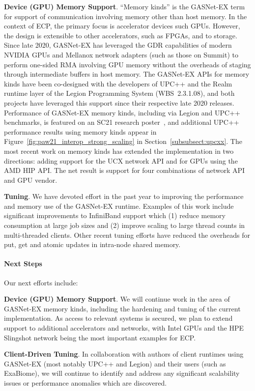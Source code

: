 \textbf{Device (GPU) Memory Support}.
``Memory kinds'' is the GASNet-EX term for support of communication involving
memory other than host memory.  In the context of ECP, the primary focus is
accelerator devices such GPUs.  However, the design is extensible to other
accelerators, such as FPGAs, and to storage.
Since late 2020, GASNet-EX has leveraged the GDR
capabilities of modern NVIDIA GPUs and Mellanox network adapters (such as those
on Summit) to perform one-sided RMA involving GPU memory without
the overheads of staging through intermediate buffers in host memory.
The GASNet-EX APIs for memory kinds have been co-designed with the developers
of UPC++ and the Realm runtime layer of the Legion Programming System
(WBS~2.3.1.08), and both projects have leveraged this support since
their respective late 2020 releases.
Performance of GASNet-EX memory kinds, including via Legion and UPC++
benchmarks, is featured on an SC21 research poster~\cite{gasnet-poster-sc21},
and additional UPC++ performance results using memory kinds appear in
Figure~\ref{fig:paw21_interop_strong_scaling} in
Section~\ref{subsubsect:upcxx}.
The most recent work on memory kinds has extended the implementation in two directions:
adding support for the UCX network API and for GPUs using the AMD HIP API.
The net result is support for four combinations of network API and GPU vendor.

\textbf{Tuning}.
We have devoted effort in the past year to improving the performance and memory
use of the GASNet-EX runtime.  Examples of this work include significant
improvements to InfiniBand support which (1) reduce memory consumption at large
job sizes and (2) improve scaling to large thread counts in multi-threaded
clients.  Other recent tuning efforts have reduced the overheads for put, get
and atomic updates in intra-node shared memory.

\paragraph{Next Steps}

Our next efforts include:

\textbf{Device (GPU) Memory Support}.
We will continue work in the area of GASNet-EX memory kinds, including the
hardening and tuning of the current implementation.
As access to relevant systems is secured, we plan to extend support to
additional accelerators and networks, with Intel GPUs and the HPE Slingshot
network being the most important examples for ECP.

\textbf{Client-Driven Tuning}.
In collaboration with authors of client runtimes using GASNet-EX (most notably
UPC++ and Legion) and their users (such as ExaBiome), we will continue to
identify and address any significant scalability issues or performance
anomalies which are discovered.

\clearpage

